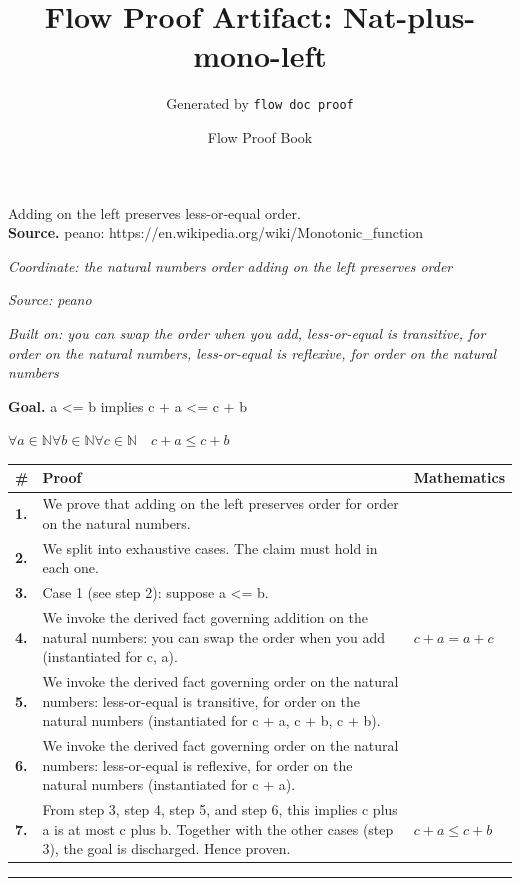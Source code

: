\documentclass[11pt]{article}
\title{Flow Proof Artifact: Nat-plus-mono-left}
\author{Generated by \texttt{flow doc proof}}
\date{Flow Proof Book}
\theoremstyle{definition}
\begin{document}
\maketitle
Adding on the left preserves less-or-equal order.\\[0.5em]
\textbf{Source.} peano: https://en.wikipedia.org/wiki/Monotonic\_function\\[0.5em]
\bigskip
{}\par
\smallskip\noindent\textit{Coordinate: the natural numbers \cdot order \cdot adding on the left preserves order}\par
\smallskip\noindent\textit{Source: peano}\par
\smallskip\noindent\textit{Built on: you can swap the order when you add, less-or-equal is transitive, for order on the natural numbers, less-or-equal is reflexive, for order on the natural numbers}\par
\medskip
\noindent\textbf{Goal.} a <= b implies c + a <= c + b\par
\noindent$\displaystyle \forall a \in \mathbb{N} \forall b \in \mathbb{N} \forall c \in \mathbb{N}\quad c + a \le c + b$\par
\medskip
\noindent
\begin{tabular}{@{} >{\raggedright\arraybackslash}p{} >{\raggedright\arraybackslash}p{} >{\raggedleft\arraybackslash}p{} @{}}
\textbf{\#} & \textbf{Proof} & \textbf{Mathematics} \\
\midrule
\textbf{1.} & We prove that adding on the left preserves order for order on the natural numbers. & \\[0.45em]
\textbf{2.} & We split into exhaustive cases. The claim must hold in each one. & \\[0.45em]
\textbf{3.} & Case 1 (see step 2): suppose a <= b. & \\[0.45em]
\textbf{4.} & We invoke the derived fact governing addition on the natural numbers: you can swap the order when you add (instantiated for c, a). & $\displaystyle c + a = a + c$ \\[0.45em]
\textbf{5.} & We invoke the derived fact governing order on the natural numbers: less-or-equal is transitive, for order on the natural numbers (instantiated for c + a, c + b, c + b). & \\[0.45em]
\textbf{6.} & We invoke the derived fact governing order on the natural numbers: less-or-equal is reflexive, for order on the natural numbers (instantiated for c + a). & \\[0.45em]
\textbf{7.} & From step 3, step 4, step 5, and step 6, this implies c plus a is at most c plus b. Together with the other cases (step 3), the goal is discharged. Hence proven. & $\displaystyle c + a \le c + b$ \\[0.45em]
\bottomrule
\end{tabular}
\label{thm:Nat-order-adding_on_the_left_preserves_order}
\par\medskip\hrule
\end{document}
